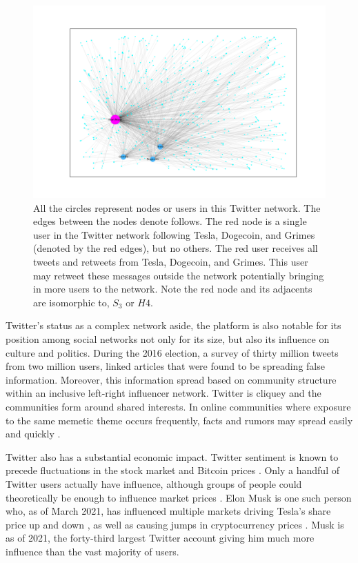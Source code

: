 \begin{figure}
    \includegraphics[width=15cm]{Images/elon_graph.png}
    \centering
    \caption{All the circles represent nodes or users in this Twitter network. The edges between the nodes denote follows.
     The red node is a single user in the Twitter network following Tesla, Dogecoin, and Grimes (denoted by the red edges), but no others. The 
    red user receives all tweets and retweets from Tesla, Dogecoin, and Grimes. This user may retweet these messages
    outside the network potentially bringing in more users to the network. Note the red node and its adjacents are isomorphic to, $S_3$ or $H4$.}
\end{figure}


Twitter's status as a complex network aside, the platform is also notable for its position among social networks not only for its size,
but also its influence on culture and politics. During the 2016 election, a survey of
thirty million tweets from two million users, linked articles that were found to be spreading
false information. Moreover, this information spread based on community structure within an inclusive left-right
influencer network. Twitter is cliquey and the communities form around 
shared interests. In online communities where exposure to the same memetic theme occurs frequently, 
facts and rumors may spread easily and quickly \cite{bessi}.

Twitter also has a substantial economic impact. Twitter sentiment is known to precede fluctuations
in the stock market \cite{Bollen2011} and Bitcoin prices \cite{bitcoin}. Only a handful of Twitter users actually have influence, 
although groups of people could theoretically be enough to influence market prices \cite{stonks}.
Elon Musk is one such person who, as of March 2021, has influenced multiple markets driving Tesla's share
price up and down \cite{elontweet}, as well as causing jumps in cryptocurrency prices  \cite{elontweet2} \cite{dogecoin}. Musk 
is as of 2021, the forty-third largest Twitter account giving him much more influence than the vast majority of users.


